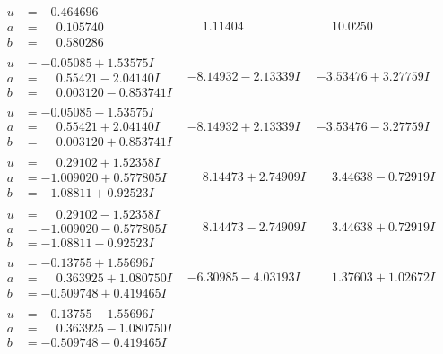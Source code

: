 \documentclass[1p]{elsarticle_modified}
\theoremstyle{definition}
\begin{document}
$$\begin{array}{c|c|c}
\begin{aligned}
u &= -0.464696\phantom{ +0.000000I} \\
a &= \phantom{-}0.105740\phantom{ +0.000000I} \\
b &= \phantom{-}0.580286\phantom{ +0.000000I}\end{aligned}
 & \phantom{-}1.11404\phantom{ +0.000000I} & \phantom{-}10.0250\phantom{ +0.000000I} \\ \hline\begin{aligned}
u &= -0.05085 + 1.53575 I \\
a &= \phantom{-}0.55421 - 2.04140 I \\
b &= \phantom{-}0.003120 - 0.853741 I\end{aligned}
 & -8.14932 - 2.13339 I & -3.53476 + 3.27759 I \\ \hline\begin{aligned}
u &= -0.05085 - 1.53575 I \\
a &= \phantom{-}0.55421 + 2.04140 I \\
b &= \phantom{-}0.003120 + 0.853741 I\end{aligned}
 & -8.14932 + 2.13339 I & -3.53476 - 3.27759 I \\ \hline\begin{aligned}
u &= \phantom{-}0.29102 + 1.52358 I \\
a &= -1.009020 + 0.577805 I \\
b &= -1.08811 + 0.92523 I\end{aligned}
 & \phantom{-}8.14473 + 2.74909 I & \phantom{-}3.44638 - 0.72919 I \\ \hline\begin{aligned}
u &= \phantom{-}0.29102 - 1.52358 I \\
a &= -1.009020 - 0.577805 I \\
b &= -1.08811 - 0.92523 I\end{aligned}
 & \phantom{-}8.14473 - 2.74909 I & \phantom{-}3.44638 + 0.72919 I \\ \hline\begin{aligned}
u &= -0.13755 + 1.55696 I \\
a &= \phantom{-}0.363925 + 1.080750 I \\
b &= -0.509748 + 0.419465 I\end{aligned}
 & -6.30985 - 4.03193 I & \phantom{-}1.37603 + 1.02672 I \\ \hline\begin{aligned}
u &= -0.13755 - 1.55696 I \\
a &= \phantom{-}0.363925 - 1.080750 I \\
b &= -0.509748 - 0.419465 I\end{aligned}

\end{array}$$
\end{document}
